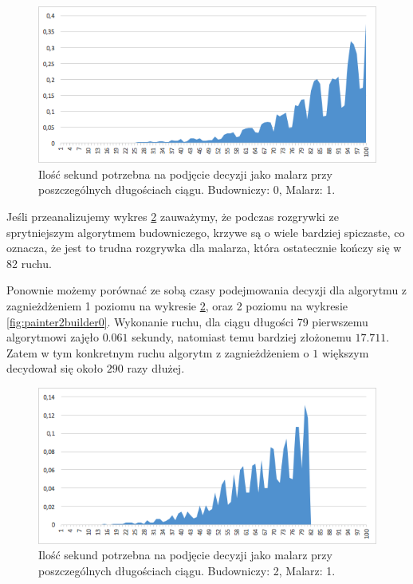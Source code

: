 \documentclass[document]{xmgr}
\begin{document}
\begin{figure}[h]
    \centering
    \includegraphics[scale = 0.7]{images/timePainter1Builder0}
    \caption{Ilość sekund potrzebna na podjęcie decyzji jako malarz przy poszczególnych długościach ciągu. Budowniczy: 0, Malarz: 1.}
    \label{fig:painter1builder0}
\end{figure}

Jeśli przeanalizujemy wykres \ref{fig:painter1builder2} zauważymy, że podczas rozgrywki ze sprytniejszym algorytmem budowniczego, krzywe są o wiele bardziej spiczaste, co oznacza, że jest to trudna rozgrywka dla malarza, która ostatecznie kończy się w 82 ruchu.

Ponownie możemy porównać ze sobą czasy podejmowania decyzji dla algorytmu z zagnieżdżeniem 1 poziomu na wykresie \ref{fig:painter1builder2}, oraz 2 poziomu na wykresie \ref{fig:painter2builder0}. Wykonanie ruchu, dla ciągu długości 79 pierwszemu algorytmowi zajęło $0.061$ sekundy, natomiast temu bardziej złożonemu $17.711$. Zatem w tym konkretnym ruchu algorytm z zagnieżdżeniem o $1$ większym decydował się około $290$ razy dłużej.

\begin{figure}[h]
    \centering
    \includegraphics[scale = 0.7]{images/timePainter1Builder2}
    \caption{Ilość sekund potrzebna na podjęcie decyzji jako malarz przy poszczególnych długościach ciągu. Budowniczy: 2, Malarz: 1.}
    \label{fig:painter1builder2}
\end{figure}
\end{document}
